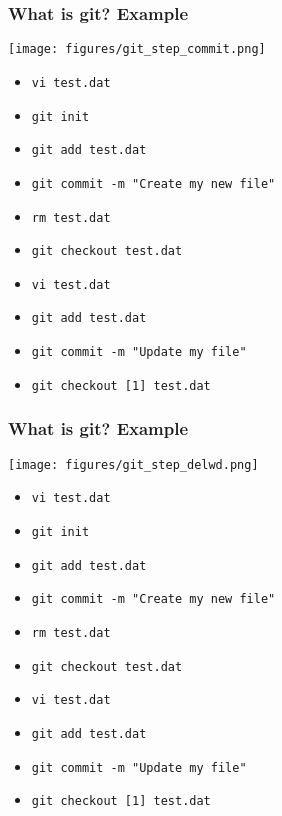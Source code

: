 \documentclass[xcolor=dvipsnames,10pt]{beamer}
\begin{document}
\addtocounter{framenumber}{-1}
\begin{frame}
 \frametitle{What is git? Example}
 
 \begin{center}
  \texttt{[image: figures/git\_step\_commit.png]}
 \end{center}
 \vspace*{-0.5cm}
 
 \begin{itemize}
  \color{gray}
  \item[] \texttt{vi test.dat}
  \item[] \texttt{git init}
  \item[] \texttt{git add test.dat}
  \color{black}
  \item   \texttt{git commit -m "Create my new file"}
  \color{white}
  \item[] \texttt{rm test.dat}
  \item[] \texttt{git checkout test.dat}
  \item[] \texttt{vi test.dat}
  \item[] \texttt{git add test.dat}
  \item[] \texttt{git commit -m "Update my file"}
  \item[] \texttt{git checkout [1] test.dat}
 \end{itemize}


\end{frame}
\addtocounter{framenumber}{-1}
\begin{frame}
 \frametitle{What is git? Example}
 
 \begin{center}
  \texttt{[image: figures/git\_step\_delwd.png]}
 \end{center}
 \vspace*{-0.5cm}
 
 \begin{itemize}
  \color{gray}
  \item[] \texttt{vi test.dat}
  \item[] \texttt{git init}
  \item[] \texttt{git add test.dat}
  \item[] \texttt{git commit -m "Create my new file"}
  \color{black}
  \item   \texttt{rm test.dat}
  \color{white}
  \item[] \texttt{git checkout test.dat}
  \item[] \texttt{vi test.dat}
  \item[] \texttt{git add test.dat}
  \item[] \texttt{git commit -m "Update my file"}
  \item[] \texttt{git checkout [1] test.dat}
 \end{itemize}

\end{frame}
\end{document}
